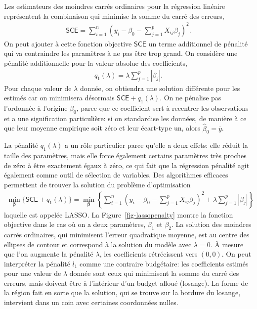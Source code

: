 \documentclass[
  11pt,
  letterpaper,
]{book}
\theoremstyle{definition}
\theoremstyle{remark}
\begin{document}
Les estimateurs des moindres carrés ordinaires pour la régression
linéaire représentent la combinaison qui minimise la somme du carré des
erreurs, \begin{align*}
\mathsf{SCE} = \sum_{i=1}^n \left(y_i - \beta_0 - \sum_{j=1}^pX_{ij}\beta_{j}\right)^2.
\end{align*} On peut ajouter à cette fonction objective \(\mathsf{SCE}\)
un terme additionnel de pénalité qui va contraindre les paramètres à ne
pas être trop grand. On considère une pénalité additionnelle pour la
valeur absolue des coefficients, \begin{align*}
q_1(\lambda) = \lambda \sum_{j=1}^p |\beta_j|.
\end{align*} Pour chaque valeur de \(\lambda\) donnée, on obtiendra une
solution différente pour les estimés car on minimisera désormais
\(\mathsf{SCE} + q_1(\lambda)\). On ne pénalise pas l'ordonnée à
l'origine \(\beta_0\), parce que ce coefficient sert à recentrer les
observations et a une signification particulière: si on standardise les
données, de manière à ce que leur moyenne empirique soit zéro et leur
écart-type un, alors \(\widehat{\beta}_0 = \overline{y}\).

La pénalité \(q_1(\lambda)\) a un rôle particulier parce qu'elle a deux
effets: elle réduit la taille des paramètres, mais elle force également
certains paramètres très proches de zéro à être exactement égaux à zéro,
ce qui fait que la régression pénalité agit également comme outil de
sélection de variables. Des algorithmes efficaces permettent de trouver
la solution du problème d'optimisation \begin{align*}
\min_{\boldsymbol{\beta}} \{\mathsf{SCE} + q_1(\lambda)\} = \min_{\boldsymbol{\beta}}  \left\{\sum_{i=1}^n \left(y_i - \beta_0 - \sum_{j=1}^pX_{ij}\beta_{j}\right)^2 +
\lambda \sum_{j=1}^p |\beta_j|\right\}
\end{align*} laquelle est appelée LASSO. La
Figure~\ref{fig-lassopenalty} montre la fonction objective dans le cas
où on a deux paramètres, \(\beta_1\) et \(\beta_2\). La solution des
moindres carrés ordinaires, qui minimisent l'erreur quadratique moyenne,
est au centre des ellipses de contour et correspond à la solution du
modèle avec \(\lambda=0\). À mesure que l'on augmente la pénalité
\(\lambda\), les coefficients rétrécissent vers \((0, 0)\). On peut
interpréter la pénalité \(l_1\) comme une contraire budgétaire: les
coefficients estimés pour une valeur de \(\lambda\) donnée sont ceux qui
minimisent la somme du carré des erreurs, mais doivent être à
l'intérieur d'un budget alloué (losange). La forme de la région fait en
sorte que la solution, qui se trouve sur la bordure du losange,
intervient dans un coin avec certaines coordonnées nulles.
\end{document}
